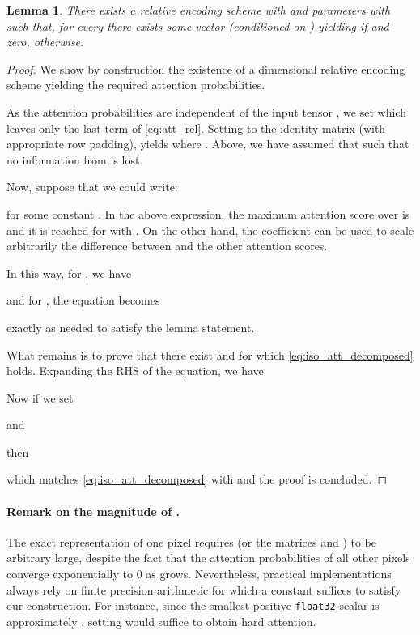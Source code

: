 \documentclass{article} \usepackage{iclr2020_conference,times}
\newtheorem{lemma}{Lemma}
\begin{document}
\begin{lemma}
There exists a relative encoding scheme 
with  and parameters  with  such that, for every  there exists some vector  (conditioned on ) yielding
 if  and zero, otherwise.
\label{lemma:2}
\end{lemma}
\vspace{-1em}
\begin{proof}
We show by construction the existence of a  dimensional relative encoding scheme yielding the required attention probabilities.

As the attention probabilities are independent of the input tensor , we set  which leaves only the last term of \cref{eq:att_rel}.
Setting  to the identity matrix (with appropriate row padding), yields
 where .
Above, we have assumed that  such that no information from  is lost.

Now, suppose that we could write:

for some constant .
In the above expression, the maximum attention score over  is  and it is reached for  with . On the other hand, the  coefficient can be used to scale arbitrarily the difference between  and the other attention scores.

In this way, for , we have

and for , the equation becomes

exactly as needed to satisfy the lemma statement.

What remains is to prove that there exist  and  for which \cref{eq:iso_att_decomposed} holds.
Expanding the RHS of the equation, we have

Now if we set

and

then

which matches \cref{eq:iso_att_decomposed} with  and the proof is concluded.
\end{proof}

\paragraph{Remark on the magnitude of .}
The exact representation of one pixel requires  (or the matrices  and ) to be arbitrary large, despite the fact that the attention probabilities of all other pixels converge exponentially to 0 as  grows.
Nevertheless, practical implementations always rely on finite precision arithmetic for which a constant  suffices to satisfy our construction. For instance, since the smallest positive \texttt{float32} scalar is approximately , setting  would suffice to obtain hard attention.
\end{document}
